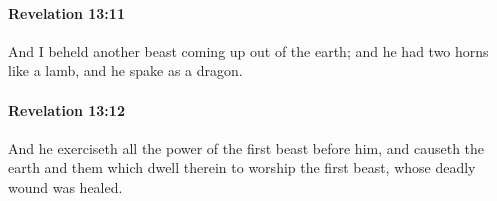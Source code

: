 		\paragraph{Revelation 13:11} %
			\label{REVELATIONNT-13-11}

			And I beheld another beast coming up out of the earth; and he had two horns like a lamb, and he spake as a dragon.

			\begin{framed}
			\scriptsize
				\begin{compactdesc}
					\item[SBLG] 
				\end{compactdesc}
			\end{framed}

		\paragraph{Revelation 13:12} %
			\label{REVELATIONNT-13-12}

			And he exerciseth all the power of the first beast before him, and causeth the earth and them which dwell therein to worship the first beast, whose deadly wound was healed.

